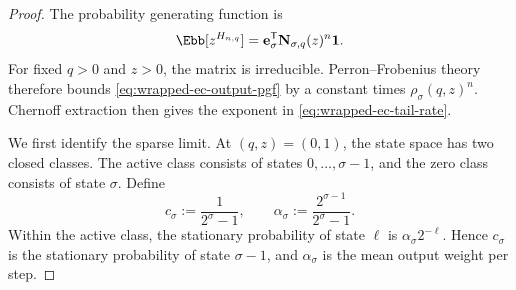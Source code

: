 \begin{proof}
The probability generating function is
\begin{equation}
 \Ebb[z^{H_{n,q}}]
 =\mathbf e_\sigma^\mathsf T
  \mathbf N_{\sigma,q}(z)^n\mathbf 1.
 \label{eq:wrapped-ec-output-pgf}
\end{equation}
For fixed $q>0$ and $z>0$, the matrix is irreducible.  Perron--Frobenius
theory therefore bounds \eqref{eq:wrapped-ec-output-pgf} by a constant times
$\rho_\sigma(q,z)^n$.  Chernoff extraction then gives the exponent in
\eqref{eq:wrapped-ec-tail-rate}.

We first identify the sparse limit.  At $(q,z)=(0,1)$, the state space has two
closed classes.  The active class consists of states $0,\ldots,\sigma-1$, and
the zero class consists of state $\sigma$.  Define
\begin{equation}
 c_\sigma:=\frac{1}{2^\sigma-1},
 \qquad
 \alpha_\sigma:=\frac{2^{\sigma-1}}{2^\sigma-1}.
 \label{eq:wrapped-ec-class-parameters}
\end{equation}
Within the active class, the stationary probability of state $\ell$ is
$\alpha_\sigma2^{-\ell}$.  Hence $c_\sigma$ is the stationary probability of
state $\sigma-1$, and $\alpha_\sigma$ is the mean output weight per step.


\end{proof}
